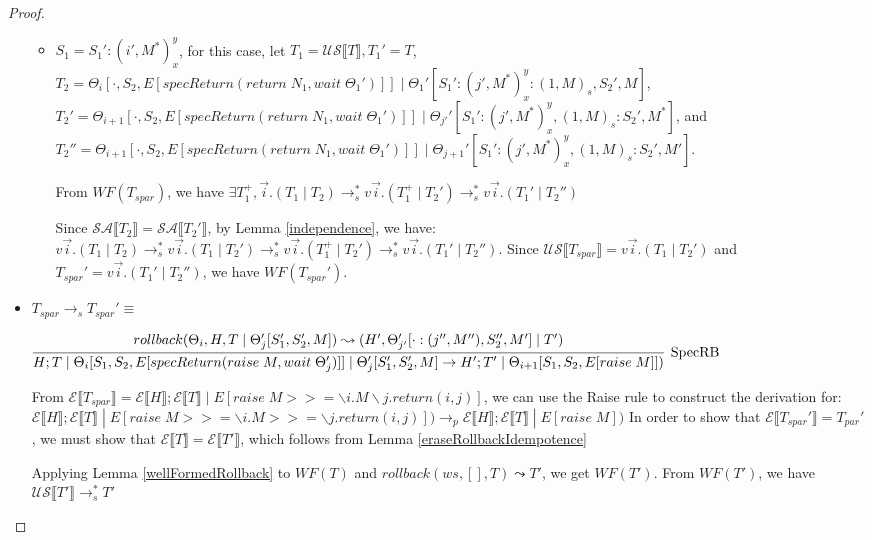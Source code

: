 \documentclass[9pt]{article}
\newcommand\specStep{\rightarrow_{s}}
\newcommand\parStep{\rightarrow_{p}}
\newcommand{\eval}[1]{E[#1]}
\newcommand{\erase}[1]{\mathcal{E}\llbracket #1 \rrbracket}
\newcommand{\unSpec}[1]{\mathcal{US} \llbracket #1 \rrbracket}
\newcommand{\specActions}[1]{\mathcal{SA} \llbracket #1 \rrbracket}
\begin{document}
\begin{proof}
\begin{itemize}
\begin{itemize}
\item $S_1 = S_1' : (i', M^*)_x^y$, for this case, let $T_1 = \unSpec{T}, T_1' = T$,\\
$T_2 = \Theta_i[\cdot, S_2, \eval{specReturn(return \; N_1, wait \; \Theta_1')}] \; | \; \Theta_1'[S_1' : (j', M^*)_x^y : (1, M)_s, S_2', M]$, \\
$T_2' = \Theta_{i+1}[\cdot, S_2, \eval{specReturn(return \; N_1, wait \; \Theta_1')}] \; | \; \Theta_{j'}'[S_1' : (j', M^*)_x^y, (1, M)_s : S_2', M^*]$, and  \\
$T_2'' = \Theta_{i+1}[\cdot, S_2, \eval{specReturn(return \; N_1, wait \; \Theta_1')}] \; | \; \Theta_{j+1}'[S_1' : (j', M^*)_x^y, (1, M)_s : S_2', M']$.  

From $WF(T_{spar})$, we have $\exists T_1^+, \vec{i}.(T_1 \; | \; T_2) \specStep^* v\vec{i}.(T_1^+ \; | \; T_2') \specStep^* v\vec{i}.(T_1' \; | \; T_2'')$

Since $\specActions{T_2} = \specActions{T_2'}$, by Lemma \ref{independence}, we have: 
$v\vec{i}.(T_1 \; | \; T_2) \specStep^* v\vec{i}.(T_1 \; | \; T_2') \specStep^* v\vec{i}.(T_1^+ \; | \; T_2') \specStep^* v\vec{i}.(T_1' \; | \; T_2'')$.  Since $\unSpec{T_{spar}} = v\vec{i}.(T_1 \; | \; T_2')$ and $T_{spar}' = v\vec{i}.(T_1' \; | \; T_2'')$, we have $WF(T_{spar}')$.  

\end{itemize}

\item $T_{spar} \specStep T_{spar}' \equiv $

$\infer[\text{SpecRB}]{H; T \; | \; \Theta_i[S_1, S_2, \eval{specReturn(raise \; M, wait \; \Theta_j')}] \; | \; \Theta_j'[S_1', S_2', M] \rightarrow H'; T' \; | \;  \Theta_{i+1}[S_1, S_2, \eval{raise \; M}])}{rollback(\Theta_i, H, T \; | \; \Theta_j'[S_1', S_2', M]) \leadsto (H', \Theta_{j'}'[\cdot : (j'', M''), S_2'', M'] \; | \; T')}$

From $\erase{T_{spar}} = \erase{H}; \erase{T} \; | \; \eval{raise \; M >>= \backslash i. M \backslash j. return(i, j)}$, we can use the Raise rule to construct the derivation for:
$\erase{H}; \erase{T} \; | \; \eval{raise \; M >>= \backslash i. M >>= \backslash j. return(i, j)}) \parStep \erase{H}; \erase{T} \; | \; \eval{raise \; M})$ In order to show that $\erase{T_{spar}'} = T_{par}'$, we must show that $\erase{T} = \erase{T'}$, which follows from Lemma \ref{eraseRollbackIdempotence}


Applying Lemma \ref{wellFormedRollback} to $WF(T)$ and $rollback(ws, [], T) \leadsto T'$, we get $WF(T')$.  From $WF(T')$, we have $\unSpec{T'} \specStep^* T'$

\end{itemize}
\end{proof}
\end{document}
